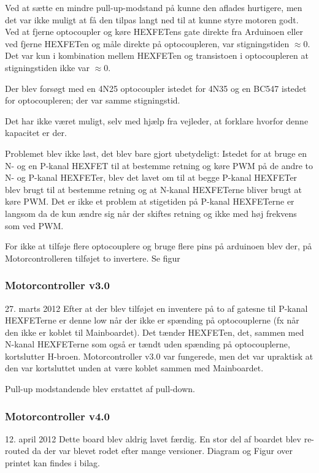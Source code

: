 \documentclass[a4paper,oneside,article,danish,table,draft]{memoir}
\newcommand{\boarddate}[1]{\textcolor{blue!80!black}{#1}}
\begin{document}
Ved at sætte en mindre pull-up-modstand på kunne den aflades hurtigere, men det var ikke muligt at få den tilpas langt ned til at kunne styre motoren godt. Ved at fjerne optocoupler og køre HEXFETens gate direkte fra Arduinoen eller ved fjerne HEXFETen og måle direkte på optocoupleren, var stigningstiden $\approx0$. Det var kun i kombination mellem HEXFETen og transistoen i optocoupleren at stigningstiden ikke var $\approx0$.

Der blev forsøgt med en 4N25 optocoupler istedet for 4N35 og en BC547 istedet for optocoupleren; der var samme stigningstid.

Det har ikke været muligt, selv med hjælp fra vejleder, at forklare hvorfor denne kapacitet er der.

Problemet blev ikke løst, det blev bare gjort ubetydeligt: Istedet for at bruge en N- og en P-kanal HEXFET til at bestemme retning og køre PWM på de andre to N- og P-kanal HEXFETer, blev det lavet om til at begge P-kanal HEXFETer blev brugt til at bestemme retning og at N-kanal HEXFETerne bliver brugt at køre PWM. Det er ikke et problem at stigetiden på P-kanal HEXFETerne er langsom da de kun ændre sig når der skiftes retning og ikke med høj frekvens som ved PWM.

For ikke at tilføje flere optocouplere og bruge flere pins på arduinoen blev der, på Motorcontrolleren tilføjet to invertere. Se figur 
\subsubsection{Motorcontroller v3.0}
\boarddate{27. marts 2012}
Efter at der blev tilføjet en inventere på to af gatesne til P-kanal HEXFETerne er denne low når der ikke er spænding på optocouplerne (fx når den ikke er koblet til Mainboardet). Det tænder HEXFETen, det, sammen med N-kanal HEXFETerne som også er tændt uden spænding på optocouplerne, kortslutter H-broen. Motorcontroller v3.0 var fungerede, men det var upraktisk at den var kortsluttet unden at være koblet sammen med Mainboardet.

Pull-up modstandende blev erstattet af pull-down.
\subsubsection{Motorcontroller v4.0}
\boarddate{12. april 2012} Dette board blev aldrig lavet færdig. En stor del af boardet blev re-routed da der var blevet rodet efter mange versioner. Diagram og Figur over printet kan findes i bilag. 
\end{document}
